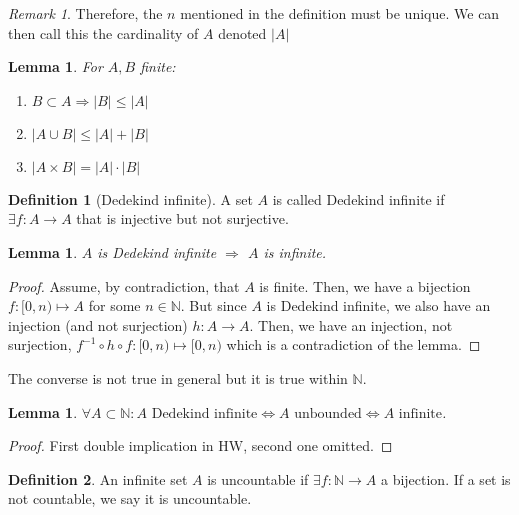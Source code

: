 \documentclass{article}
\newcommand\N{\ensuremath{\mathbb{N}}}
\newtheorem{lemma}[theorem]{Lemma}
\theoremstyle{definition}
\newtheorem{definition}{Definition}[subsection]
\theoremstyle{remark}
\newtheorem*{remark}{Remark}
\theoremstyle{plain}
\begin{document}
\begin{remark}
    Therefore, the \(n\) mentioned in the definition must be unique. We can then call this the
    cardinality of \(A\) denoted \(|A|\)
\end{remark}

\begin{lemma}
    For \(A,B\) finite:
    \begin{enumerate}
        \item \(B \subset A \Rightarrow |B| \leq |A|\)
        \item \(|A\cup B| \leq |A| + |B|\)
        \item \(|A\times B| = |A|\cdot|B|\)
    \end{enumerate}
\end{lemma}

\begin{definition}[Dedekind infinite]
    A set \(A\) is called Dedekind infinite if \(\exists f: A \to A\) that is injective but not surjective.
\end{definition}

\begin{lemma}
    \(A\) is Dedekind infinite \(\Rightarrow\) \(A\) is infinite. 
\end{lemma}
\begin{proof}
    Assume, by contradiction, that \(A\) is finite. Then, we have a bijection \(f: [0,n) \mapsto A\) for some
    \(n \in \N\). But since \(A\) is Dedekind infinite, we also have an injection (and not surjection) \(h: A \to A\). 
    Then, we have an injection, not surjection, \(f^{-1}\circ h\circ f:[0,n) \mapsto [0,n)\) which is a contradiction of the lemma.
\end{proof}

The converse is not true in general but it is true within \(\N\). 

\begin{lemma}
    \(\forall A \subset \N: A \text{ Dedekind infinite} \iff A\text{ unbounded} \iff A\text{ infinite}\).
\end{lemma}
\begin{proof}
    First double implication in HW, second one omitted.
\end{proof}

\begin{definition}
    An infinite set \(A\) is uncountable if \(\exists f: \N \to A\) a bijection. If a set is not countable, we say it is uncountable.
\end{definition}
\end{document}

